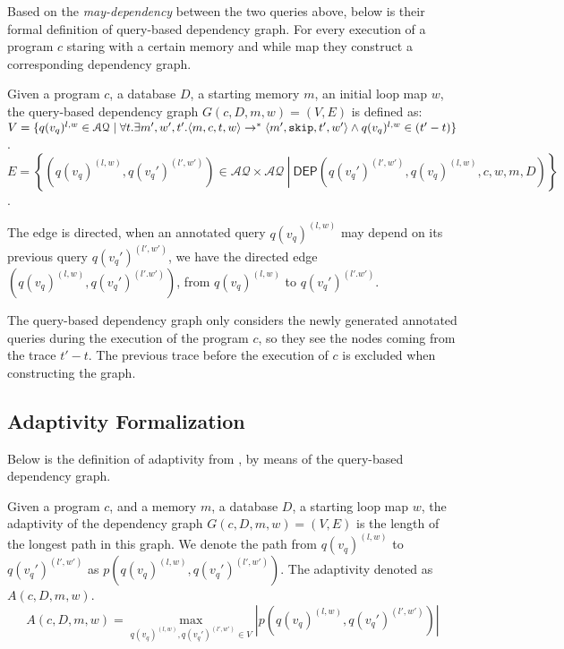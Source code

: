 %
Based on the \emph{may-dependency} between the two queries above,
below is their formal definition of query-based dependency graph. 
For every execution of a program $c$ staring with a certain memory and while map
they construct a corresponding dependency graph.  
\begin{defn}
Given a program $c$, a database $D$, a starting memory $m$, an initial loop map $w$, the query-based dependency graph $G(c,D,m,w) = (V, E)$ is defined as: \\
$V =\{q({v_q})^{l,w} \in \mathcal{AQ} \mid \forall t. \exists m',  w', t'.  \langle m ,c, t, w \rangle  \to^{*}  \langle m' , \mathtt{skip}, t', w'  \rangle  \land q({v_q})^{l,w} \in {(t'-t)}  \}$.
\\
$E = \left\{(q({v_q})^{(l,w)},q({v_q}')^{(l',w')}) \in \mathcal{AQ} \times \mathcal{AQ} 
~ \left \vert ~ \mathsf{DEP}(q({v_q}')^{(l',w')},q({v_q})^{(l,w)}, c,w,m,D)
 \right.\right\}$.
\end{defn}
%
The edge is directed, when an annotated query $q({v_q})^{(l,w)}$ may depend on its previous query $q({v_q}')^{(l',w')}$, we have the directed
edge $(q({v_q})^{(l,w)}, q({v_q}')^{(l'.w')})$, from $q({v_q})^{(l,w)} $ to $q({v_q}')^{(l'.w')}$.

The query-based dependency graph only considers the newly generated annotated queries during the execution of the program $c$,
so they see the nodes coming from the trace $t'-t$.
The previous trace before the execution of $c$ is excluded when constructing the graph.

\subsection*{Adaptivity Formalization}
Below is the definition of adaptivity from , by means of the query-based dependency graph. 
\begin{defn}
Given a program $c$, and a memory $m$, a database $D$, a starting loop map $w$, the adaptivity of the dependency graph $G(c, D,m,w) = (V, E)$ is the length of the longest path in this graph. We denote the path from $q({v_q})^{(l,w)}$ to $q({v_q}')^{(l',w')}$ as $p(q({v_q})^{(l,w)}, q({v_q}')^{(l',w')} )$. The adaptivity denoted as $A(c, D, m, w)$.
%
$$A(c, D, m, w) = \max\limits_{q({v_q})^{(l,w)},q({v_q}')^{(l',w')} \in V } |p(q({v_q})^{(l,w)}, q({v_q}')^{(l',w')} )| $$
\end{defn}
